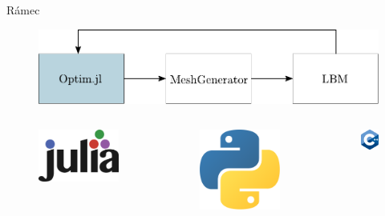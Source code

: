 \documentclass[aspectratio=169,xcolor=dvipsnames]{beamer}
\begin{document}
\begin{frame}{Rámec}
	\addtocounter{framenumber}{-1}
	\begin{figure}
		\includegraphics[width=0.9\linewidth, trim={0 -0.1cm 0 0}, clip]{Images/pipeline1.pdf}
	\end{figure}
	\vspace{-2mm}
	\begin{columns}[T] %
		\begin{column}{.31\textwidth}
			\begin{figure}
				\includegraphics[width=0.5\linewidth, trim={0 0 0 0}, clip]{Images/julia.png}
			\end{figure}
		\end{column}%
		\begin{column}{.31\textwidth}
			\begin{figure}
				\includegraphics[width=0.35\linewidth, trim={0 0 0 0cm}, clip]{Images/python.png}
			\end{figure}
		\end{column}%
		\begin{column}{.31\textwidth}
			\begin{figure}
				\includegraphics[width=0.35\linewidth, trim={0 0 0 0cm}, clip]{Images/cpp.png}
			\end{figure}
		\end{column}%
	\end{columns}
\end{frame}
\end{document}

